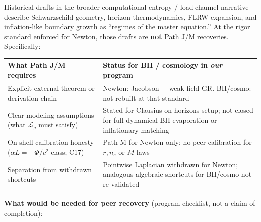 \documentclass[
  11pt,
]{article}
\newcounter{none} %
\begin{document}
Historical drafts in the broader computational-entropy / load-channel
narrative describe Schwarzschild geometry, horizon thermodynamics, FLRW
expansion, and inflation-like boundary growth as ``regimes of the master
equation.'' At the rigor standard enforced for Newton, those drafts are
\textbf{not} Path J/M recoveries. Specifically:

{\def\LTcaptype{none} %
\begin{longtable}[]{@{}
  >{\raggedright\arraybackslash}p{}
  >{\raggedright\arraybackslash}p{}@{}}
\toprule\noalign{}
\begin{minipage}[b]{\linewidth}\raggedright
What Path J/M requires
\end{minipage} & \begin{minipage}[b]{\linewidth}\raggedright
Status for BH / cosmology in \emph{our} program
\end{minipage} \\
\midrule\noalign{}
\endhead
\bottomrule\noalign{}
\endlastfoot
Explicit external theorem or derivation chain & Newton: Jacobson +
weak-field GR. BH/cosmo: not rebuilt at that standard \\
Clear modeling assumptions (what \(\mathcal{L}_g\) must satisfy) &
Stated for Clausius-on-horizons setup; not closed for full dynamical BH
evaporation or inflationary matching \\
On-shell calibration honesty (\(\alpha L=-\Phi/c^2\) class; C17) & Path M
for Newton only; no peer calibration for \(r,n_s\) or \(\dot M\) laws \\
Separation from withdrawn shortcuts & Pointwise Laplacian withdrawn for
Newton; analogous algebraic shortcuts for BH/cosmo not re-validated \\
\end{longtable}
}

\textbf{What would be needed for peer recovery} (program checklist, not
a claim of completion):
\end{document}
